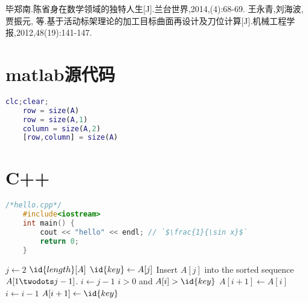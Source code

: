 \documentclass[UTF8, a4paper, 12pt]{ctexart}
\begin{document}
\begin{thebibliography}{9}%
     毕郑南.陈省身在数学领域的独特人生[J].兰台世界,2014,(4):68-69.
     王永青,刘海波,贾振元, 等.基于活动标架理论的加工目标曲面再设计及刀位计算[J].机械工程学报,2012,48(19):141-147.
\end{thebibliography}


\section*{matlab源代码}
\begin{lstlisting}[language=matlab]
    clc;clear;
    row = size(A)
    row = size(A,1)
    column = size(A,2)
    [row,column] = size(A)
\end{lstlisting}

\section*{C++}
\lstset{columns = flexible, numbers = left, numberstyle = \footnotesize, escapechar = `}
\begin{lstlisting}[language = C++]
    /*hello.cpp*/
    #include<iostream>
    int main() {
        cout << "hello" << endl; // `$\frac{1}{\sin x}$`
        return 0;
    }
\end{lstlisting}

\begin{codebox}
    \li \For $j \gets 2$ \To $\id{length}[A]$
    \li \Do
    $\id{key} \gets A[j]$
    \li \Comment Insert $A[j]$ into the sorted sequence
    $A[1 \twodots j-1]$.
    \li $i \gets j-1$
    \li \While $i > 0$ and $A[i] > \id{key}$
    \li \Do
    $A[i+1] \gets A[i]$
    \li $i \gets i-1$
    \End
    \li $A[i+1] \gets \id{key}$
    \End
\end{codebox}
\end{document}
